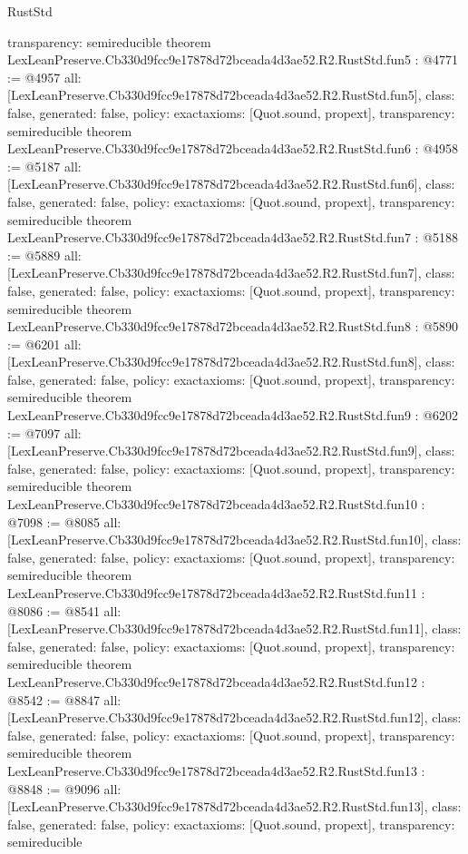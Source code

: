 \begin{lexlean}{RustStd}
\begin{coremodule}
{  transparency: semireducible
}
theorem LexLeanPreserve.Cb330d9fcc9e17878d72bceada4d3ae52.R2.RustStd.fun5 : @4771 := @4957 {
  all: [LexLeanPreserve.Cb330d9fcc9e17878d72bceada4d3ae52.R2.RustStd.fun5],
  class: false,
  generated: false,
  policy: exact{axioms: [Quot.sound, propext]},
  transparency: semireducible
}
theorem LexLeanPreserve.Cb330d9fcc9e17878d72bceada4d3ae52.R2.RustStd.fun6 : @4958 := @5187 {
  all: [LexLeanPreserve.Cb330d9fcc9e17878d72bceada4d3ae52.R2.RustStd.fun6],
  class: false,
  generated: false,
  policy: exact{axioms: [Quot.sound, propext]},
  transparency: semireducible
}
theorem LexLeanPreserve.Cb330d9fcc9e17878d72bceada4d3ae52.R2.RustStd.fun7 : @5188 := @5889 {
  all: [LexLeanPreserve.Cb330d9fcc9e17878d72bceada4d3ae52.R2.RustStd.fun7],
  class: false,
  generated: false,
  policy: exact{axioms: [Quot.sound, propext]},
  transparency: semireducible
}
theorem LexLeanPreserve.Cb330d9fcc9e17878d72bceada4d3ae52.R2.RustStd.fun8 : @5890 := @6201 {
  all: [LexLeanPreserve.Cb330d9fcc9e17878d72bceada4d3ae52.R2.RustStd.fun8],
  class: false,
  generated: false,
  policy: exact{axioms: [Quot.sound, propext]},
  transparency: semireducible
}
theorem LexLeanPreserve.Cb330d9fcc9e17878d72bceada4d3ae52.R2.RustStd.fun9 : @6202 := @7097 {
  all: [LexLeanPreserve.Cb330d9fcc9e17878d72bceada4d3ae52.R2.RustStd.fun9],
  class: false,
  generated: false,
  policy: exact{axioms: [Quot.sound, propext]},
  transparency: semireducible
}
theorem LexLeanPreserve.Cb330d9fcc9e17878d72bceada4d3ae52.R2.RustStd.fun10 : @7098 := @8085 {
  all: [LexLeanPreserve.Cb330d9fcc9e17878d72bceada4d3ae52.R2.RustStd.fun10],
  class: false,
  generated: false,
  policy: exact{axioms: [Quot.sound, propext]},
  transparency: semireducible
}
theorem LexLeanPreserve.Cb330d9fcc9e17878d72bceada4d3ae52.R2.RustStd.fun11 : @8086 := @8541 {
  all: [LexLeanPreserve.Cb330d9fcc9e17878d72bceada4d3ae52.R2.RustStd.fun11],
  class: false,
  generated: false,
  policy: exact{axioms: [Quot.sound, propext]},
  transparency: semireducible
}
theorem LexLeanPreserve.Cb330d9fcc9e17878d72bceada4d3ae52.R2.RustStd.fun12 : @8542 := @8847 {
  all: [LexLeanPreserve.Cb330d9fcc9e17878d72bceada4d3ae52.R2.RustStd.fun12],
  class: false,
  generated: false,
  policy: exact{axioms: [Quot.sound, propext]},
  transparency: semireducible
}
theorem LexLeanPreserve.Cb330d9fcc9e17878d72bceada4d3ae52.R2.RustStd.fun13 : @8848 := @9096 {
  all: [LexLeanPreserve.Cb330d9fcc9e17878d72bceada4d3ae52.R2.RustStd.fun13],
  class: false,
  generated: false,
  policy: exact{axioms: [Quot.sound, propext]},
  transparency: semireducible
}
\end{coremodule}
\end{lexlean}
